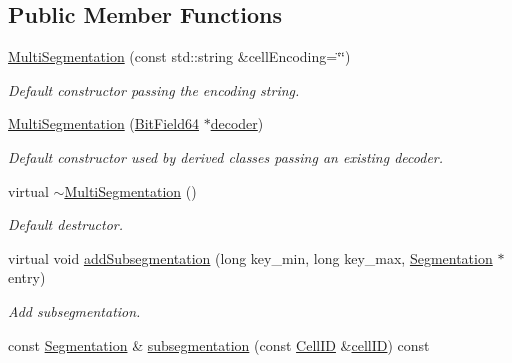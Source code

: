 \subsection*{Public Member Functions}
\begin{DoxyCompactItemize}
\item 
\hyperlink{class_d_d4hep_1_1_d_d_segmentation_1_1_multi_segmentation_ad1a80e739f693a231afc09295a565e85}{Multi\+Segmentation} (const std\+::string \&cell\+Encoding=\char`\"{}\char`\"{})
\begin{DoxyCompactList}\small\item\em Default constructor passing the encoding string. \end{DoxyCompactList}\item 
\hyperlink{class_d_d4hep_1_1_d_d_segmentation_1_1_multi_segmentation_a2d73598a701bfad32ba2be3793799bd8}{Multi\+Segmentation} (\hyperlink{class_d_d4hep_1_1_d_d_segmentation_1_1_bit_field64}{Bit\+Field64} $\ast$\hyperlink{class_d_d4hep_1_1_d_d_segmentation_1_1_segmentation_abec3489982d0fe91ef4b142d9d755576}{decoder})
\begin{DoxyCompactList}\small\item\em Default constructor used by derived classes passing an existing decoder. \end{DoxyCompactList}\item 
virtual \hyperlink{class_d_d4hep_1_1_d_d_segmentation_1_1_multi_segmentation_ac59d1f2a2145181f48c0c7ffdd13a5ba}{$\sim$\+Multi\+Segmentation} ()
\begin{DoxyCompactList}\small\item\em Default destructor. \end{DoxyCompactList}\item 
virtual void \hyperlink{class_d_d4hep_1_1_d_d_segmentation_1_1_multi_segmentation_aa92e91f45ba11b074fd6cafb87e15325}{add\+Subsegmentation} (long key\+\_\+min, long key\+\_\+max, \hyperlink{class_d_d4hep_1_1_d_d_segmentation_1_1_segmentation}{Segmentation} $\ast$entry)
\begin{DoxyCompactList}\small\item\em Add subsegmentation. \end{DoxyCompactList}\item 
const \hyperlink{class_d_d4hep_1_1_d_d_segmentation_1_1_segmentation}{Segmentation} \& \hyperlink{class_d_d4hep_1_1_d_d_segmentation_1_1_multi_segmentation_ab92a5093c6c11598715a9af554475175}{subsegmentation} (const \hyperlink{namespace_d_d4hep_1_1_d_d_segmentation_ac7af071d85cb48820914434a07e21ba1}{Cell\+ID} \&\hyperlink{class_d_d4hep_1_1_d_d_segmentation_1_1_multi_segmentation_a3e054169c43049547cdd67e4f2f60105}{cell\+ID}) const

\end{DoxyCompactItemize}
